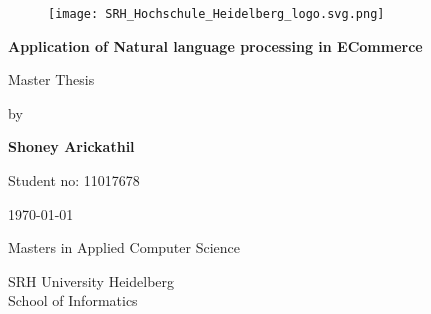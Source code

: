 \begin{titlepage}

    \begin{figure}[H]
  
        \texttt{[image: SRH\_Hochschule\_Heidelberg\_logo.svg.png]}
    
    \end{figure}

    \centering
   


    {\Large \bfseries Application of Natural language processing in ECommerce}
    \vspace*{3\baselineskip}

    {\Large Master Thesis}
    \vspace*{1\baselineskip}

    {\Large by }
    \vspace*{2\baselineskip}

    {\Large  \bfseries Shoney Arickathil }
    \vspace*{0.5\baselineskip}

    {\Large  Student no: 11017678 }
    \vspace*{2\baselineskip}

    {\Large \today}
    \vspace*{3\baselineskip}


    {\Large  Masters in Applied Computer Science }
    \vspace*{0.5\baselineskip}

    {\Large  SRH University Heidelberg \\ School of Informatics}  
    \vspace*{3\baselineskip}



   
    
\end{titlepage}